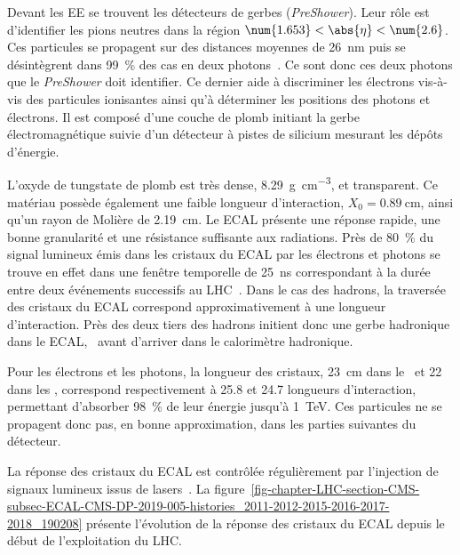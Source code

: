 \par Devant les EE se trouvent les détecteurs de gerbes (\emph{PreShower}).
Leur rôle est d'identifier les pions neutres dans la région $\num{1.653}<\abs{\eta}<\num{2.6}$.
Ces particules se propagent sur des distances moyennes de \SI{26}{\nano\meter} puis se désintègrent dans \SI{99}{\%} des cas en deux photons~\cite{PDG_booklet_2020}.
Ce sont donc ces deux photons que le \emph{PreShower} doit identifier.
Ce dernier aide à discriminer les électrons vis-à-vis des particules ionisantes ainsi qu'à déterminer les positions des photons et électrons.
Il est composé d'une couche de plomb initiant la gerbe électromagnétique suivie d'un détecteur à pistes de silicium mesurant les dépôts d'énergie.
\par L'oxyde de tungstate de plomb est très dense, \SI{8.29}{\gram.\centi\meter^{-3}}, et transparent.
Ce matériau possède également une faible longueur d'interaction, $X_0=\SI{0.89}{\centi\meter}$, ainsi qu'un rayon de Molière de \SI{2.19}{\centi\meter}.
Le ECAL présente une réponse rapide, une bonne granularité et une résistance suffisante aux radiations.
Près de \SI{80}{\%} du signal lumineux émis dans les cristaux du ECAL par les électrons et photons se trouve en effet dans une fenêtre temporelle de \SI{25}{\nano\second} correspondant à la durée entre deux événements successifs au LHC~\cite{cms_paper}.
Dans le cas des hadrons, la traversée des cristaux du ECAL correspond approximativement à une longueur d'interaction.
Près des deux tiers des hadrons initient donc une gerbe hadronique dans le ECAL, \ie\ avant d'arriver dans le calorimètre hadronique.
\par Pour les électrons et les photons, la longueur des cristaux, \SI{23}{\centi\meter} dans le \CMSbarrel\ et \num{22} dans les \CMSendcaps, correspond respectivement à \num{25.8} et \num{24.7} longueurs d'interaction, permettant d'absorber \SI{98}{\%} de leur énergie jusqu'à \SI{1}{\TeV}.
Ces particules ne se propagent donc pas, en bonne approximation, dans les parties suivantes du détecteur.
\par La réponse des cristaux du ECAL est contrôlée régulièrement par l'injection de signaux lumineux issus de lasers~\cite{CMS-DP-2019-005}.
La figure~\ref{fig-chapter-LHC-section-CMS-subsec-ECAL-CMS-DP-2019-005-histories_2011-2012-2015-2016-2017-2018_190208} présente l'évolution de la réponse des cristaux du ECAL depuis le début de l'exploitation du LHC.
